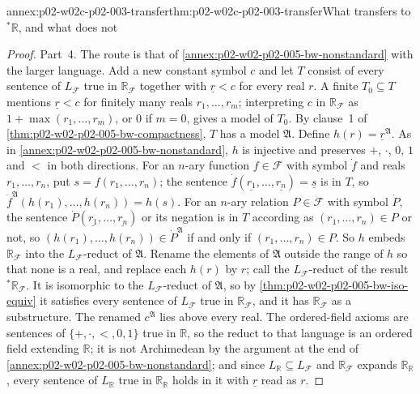 \begin{annexitem}{annex:p02-w02c-p02-003-transfer}{thm:p02-w02c-p02-003-transfer}{What transfers to \({}^*\mathbb R\), and what does not}
\begin{proof}
Part~4.  The route is that of
\cref{annex:p02-w02-p02-005-bw-nonstandard} with the larger language.  Add
a new constant symbol \(c\) and let \(T\) consist of every sentence of
\(L_{\mathcal F}\) true in \(\mathbb R_{\mathcal F}\) together with
\(\underline r<c\) for every real \(r\).  A finite \(T_0\subseteq T\)
mentions \(\underline r<c\) for finitely many reals \(r_1,\ldots,r_m\);
interpreting \(c\) in \(\mathbb R_{\mathcal F}\) as
\(1+\max(r_1,\ldots,r_m)\), or \(0\) if \(m=0\), gives a model of \(T_0\).
By clause~1 of \cref{thm:p02-w02-p02-005-bw-compactness}, \(T\) has a model
\(\mathfrak A\).  Define \(h(r)=\underline r^{\mathfrak A}\).  As in
\cref{annex:p02-w02-p02-005-bw-nonstandard}, \(h\) is injective and
preserves \(+\), \(\cdot\), \(0\), \(1\) and \(<\) in both directions.  For
an \(n\)-ary function \(f\in\mathcal F\) with symbol \(\dot f\) and reals
\(r_1,\ldots,r_n\), put \(s=f(r_1,\ldots,r_n)\); the sentence
\(\dot f(\underline{r_1},\ldots,\underline{r_n})=\underline s\) is in
\(T\), so \(\dot f^{\mathfrak A}(h(r_1),\ldots,h(r_n))=h(s)\).  For an
\(n\)-ary relation \(P\in\mathcal F\) with symbol \(\dot P\), the sentence
\(\dot P(\underline{r_1},\ldots,\underline{r_n})\) or its negation is in
\(T\) according as \((r_1,\ldots,r_n)\in P\) or not, so
\((h(r_1),\ldots,h(r_n))\in\dot P^{\mathfrak A}\) if and only if
\((r_1,\ldots,r_n)\in P\).  So \(h\) embeds \(\mathbb R_{\mathcal F}\)
into the \(L_{\mathcal F}\)-reduct of \(\mathfrak A\).  Rename the
elements of \(\mathfrak A\) outside the range of \(h\) so that none is a
real, and replace each \(h(r)\) by \(r\); call the \(L_{\mathcal F}\)-reduct
of the result \({}^*\mathbb R_{\mathcal F}\).  It is isomorphic to the
\(L_{\mathcal F}\)-reduct of \(\mathfrak A\), so by
\cref{thm:p02-w02-p02-005-bw-iso-equiv} it satisfies every sentence of
\(L_{\mathcal F}\) true in \(\mathbb R_{\mathcal F}\), and it has
\(\mathbb R_{\mathcal F}\) as a substructure.  The renamed
\(c^{\mathfrak A}\) lies above every real.  The ordered-field axioms are
sentences of \(\{+,\cdot,<,0,1\}\) true in \(\mathbb R\), so the reduct to
that language is an ordered field extending \(\mathbb R\); it is not
Archimedean by the argument at the end of
\cref{annex:p02-w02-p02-005-bw-nonstandard}; and since
\(L_{\mathbb R}\subseteq L_{\mathcal F}\) and
\(\mathbb R_{\mathcal F}\) expands \(\mathbb R_{\mathbb R}\), every
sentence of \(L_{\mathbb R}\) true in \(\mathbb R_{\mathbb R}\) holds in
it with \(\underline r\) read as \(r\).
\end{proof}
\end{annexitem}

